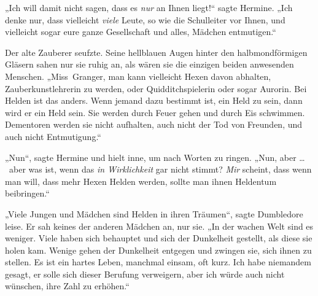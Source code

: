 „Ich will damit nicht sagen, dass es \emph{nur} an Ihnen liegt!“ sagte Hermine.
„Ich denke nur, dass vielleicht \emph{viele} Leute, so wie die Schulleiter vor Ihnen, und vielleicht sogar eure ganze Gesellschaft und alles, Mädchen entmutigen.“

Der alte Zauberer seufzte. Seine hellblauen Augen hinter den halbmondförmigen Gläsern sahen nur sie ruhig an, als wären sie die einzigen beiden anwesenden Menschen.
„Miss~Granger, man kann vielleicht Hexen davon abhalten, Zauberkunstlehrerin zu werden, oder Quidditchspielerin oder sogar Aurorin. Bei Helden ist das anders. Wenn jemand dazu bestimmt ist, ein Held zu sein, dann wird er ein Held sein. Sie werden durch Feuer gehen und durch Eis schwimmen. Dementoren werden sie nicht aufhalten, auch nicht der Tod von Freunden, und auch nicht Entmutigung.“

„Nun“, sagte Hermine und hielt inne, um nach Worten zu ringen.
„Nun, aber … ~aber was ist, wenn das \emph{in Wirklichkeit} gar nicht stimmt? \emph{Mir} scheint, dass wenn man will, dass mehr Hexen Helden werden, sollte man ihnen Heldentum beibringen.“

„Viele Jungen und Mädchen sind Helden in ihren Träumen“, sagte Dumbledore leise. Er sah keines der anderen Mädchen an, nur sie.
„In der wachen Welt sind es weniger. Viele haben sich behauptet und sich der Dunkelheit gestellt, als diese sie holen kam. Wenige gehen der Dunkelheit entgegen und zwingen sie, sich ihnen zu stellen. Es ist ein hartes Leben, manchmal einsam, oft kurz. Ich habe niemandem gesagt, er solle sich dieser Berufung verweigern, aber ich würde auch nicht wünschen, ihre Zahl zu erhöhen.“

